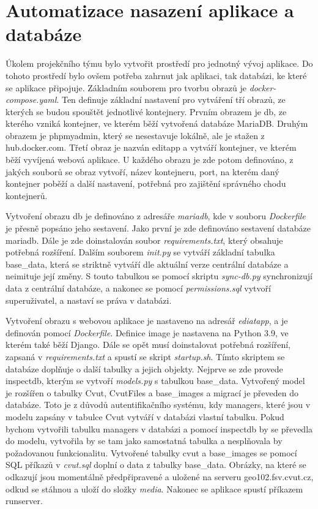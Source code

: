\section{Automatizace nasazení aplikace a databáze}


Úkolem projekčního týmu bylo vytvořit prostředí pro jednotný vývoj
aplikace. Do tohoto prostředí bylo ovšem potřeba zahrnut jak aplikaci,
tak databázi, ke které se aplikace připojuje. Základním souborem pro
tvorbu obrazů je \emph{docker-compose.yaml}. Ten definuje základní
nastavení pro vytváření tří obrazů, ze kterých se budou spouštět
jednotlivé kontejnery. Prvním obrazem je db, ze kterého vzniká
kontejner, ve kterém běží vytvořená databáze MariaDB. Druhým obrazem
je phpmyadmin, který se nesestavuje lokálně, ale je stažen z
hub.docker.com. Třetí obraz je nazván editapp a vytváří kontejner, ve
kterém běží vyvíjená webová aplikace. U každého obrazu je zde potom
definováno, z jakých souborů se obraz vytvoří, název kontejneru, port,
na kterém daný kontejner poběží a další nastavení, potřebná pro
zajištění správného chodu kontejnerů.

Vytvoření obrazu db je definováno z adresáře \emph{mariadb}, kde v
souboru \emph{Dockerfile} je přesně popsáno jeho sestavení. Jako první
je zde definováno sestavení databáze mariadb. Dále je zde doinstalován
soubor \emph{requirements.txt}, který obsahuje potřebná
rozšíření. Dalším souborem \emph{init.py} se vytváří základní tabulka
base\_data, která se striktně vytváří dle aktuální verze centrální
databáze a neimituje její změny. S touto tabulkou se pomocí skriptu
\emph{sync-db.py} synchronizují data z centrální databáze, a nakonec
se pomocí \emph{permissions.sql} vytvoří superuživatel, a nastaví se
práva v databázi.

Vytvoření obrazu s webovou aplikace je nastaveno na adresář
\emph{ediatapp}, a je definován pomocí \emph{Dockerfile}. Definice
image je nastavena na Python 3.9, ve kterém také běží Django. Dále se
opět musí doinstalovat potřebná rozšíření, zapsaná v
\emph{requirements.txt} a spustí se skript \emph{startup.sh}. Tímto
skriptem se databáze doplňuje o další tabulky a jejich
objekty. Nejprve se zde provede inspectdb, kterým se vytvoří
\emph{models.py} s tabulkou base\_data. Vytvořený model je rozšířen o
tabulky Cvut, CvutFiles a base\_images a migrací je převeden do
databáze. Toto je z důvodů autentifikačního systému, kdy managers,
které jsou v modelu zapsány v tabulce Cvut vytváří v databázi vlastní
tabulku. Pokud bychom vytvořili tabulku managers v databázi a pomocí
inspectdb by se převedla do modelu, vytvořila by se tam jako
samostatná tabulka a nesplňovala by požadovanou
funkcionalitu. Vytvořené tabulky cvut a base\_images se pomocí SQL
příkazů v \emph{cvut.sql} doplní o data z tabulky base\_data. Obrázky,
na které se odkazují jsou momentálně předpřipravené a uložené na
serveru geo102.fsv.cvut.cz, odkud se stáhnou a uloží do složky
\emph{media}. Nakonec se aplikace spustí příkazem runserver.

